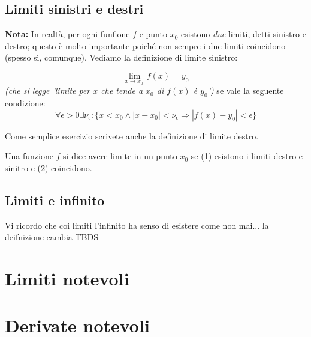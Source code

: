 \subsection{Limiti sinistri e destri}

{\bf Nota:} In realtà, per ogni funfione $f$ e punto $x_0$ esistono {\em due} limiti, detti sinistro e destro; questo è molto
importante poiché non sempre i due limiti coincidono (spesso sì, comunque). Vediamo la definizione di limite sinistro:

\begin{equation}
\lim_{x \to x_0^-} f(x) = y_0
\end{equation}
{\em (che si legge 'limite per $x$ che tende a $x_0$ di $f(x)$ è $y_0$')} se vale la seguente condizione:
\begin{equation}\label{definizionelimitebis}
\forall \epsilon >0 \exists \nu_\epsilon : \{ x<x_0 \wedge |x-x_0|<\nu_\epsilon \Longrightarrow  |f(x)-y_0|<\epsilon   \}
\end{equation}

Come semplice esercizio scrivete anche la definizione di limite destro.

Una funzione $f$ si dice avere limite in un punto $x_0$ se (1) esistono i limiti destro e sinitro e (2) coincidono.


\subsection{Limiti e infinito}
Vi ricordo che coi limiti l'infinito ha senso di esistere come non mai... la deifnizione cambia
TBDS

\section{Limiti notevoli}

\section{Derivate notevoli}

